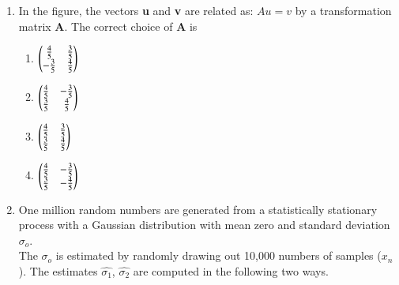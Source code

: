 \documentclass[journal]{IEEEtran}
\numberwithin{equation}{enumi}
\numberwithin{figure}{enumi}
\begin{document}
\begin{enumerate}
\begin{figure}[H]
\caption{figure(ii)}
\end{figure}
\begin{multicols}{2}
    \begin{enumerate}
        \item 10 V
        \item 6 V 
        \item 12 V
        \item 20 V
    \end{enumerate}
\end{multicols}
\bigskip
\item In the figure, the vectors \textbf{u} and \textbf{v} are related as: $Au=v$ by a transformation matrix \textbf{A}. The correct choice of \textbf{A} is 
\begin{figure}[H]
\centering
{}%
\end{figure}
\begin{multicols}{2}
\begin{enumerate}
    \item $\begin{pmatrix}\frac{4}{5} & \frac{3}{5}\\ 
    -\frac{3}{5}&\frac{4}{5}\end{pmatrix}$
    \item $\begin{pmatrix}\frac{4}{5} & -\frac{3}{5}\\ 
    \frac{3}{5}&\frac{4}{5}\end{pmatrix}$
    \item $\begin{pmatrix}\frac{4}{5} & \frac{3}{5}\\ 
    \frac{3}{5}&\frac{4}{5}\end{pmatrix}$
    \item $\begin{pmatrix}\frac{4}{5} & -\frac{3}{5}\\ 
    \frac{3}{5}& -\frac{4}{5}\end{pmatrix}$
\end{enumerate}
\end{multicols}
\bigskip
\item One million random numbers are generated from a statistically stationary process with a Gaussian distribution with mean zero and standard deviation $\sigma_o$.\\
The $\sigma_o$ is estimated by randomly drawing out 10,000 numbers of samples ($x_n$). The estimates $\hat{\sigma_1}$, $\hat{\sigma_2}$ are computed in the following two ways.

\end{enumerate}
\end{document}
